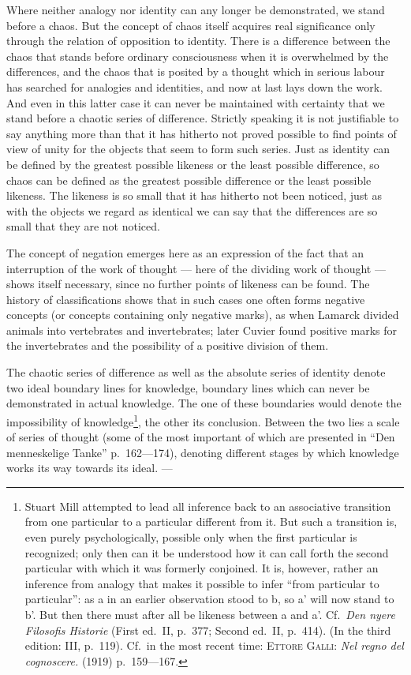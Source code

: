 \documentclass[12pt]{article}
\newcommand{\opage}[1]{\marginnote{\footnotesize\textit{[#1]}}}
\begin{document}
Where neither analogy nor identity can any longer be demonstrated, we stand
before a chaos. But the concept of chaos itself acquires real significance
only through the relation of opposition to identity. There is a difference
between the chaos that stands before ordinary consciousness when it is
overwhelmed by the differences, and the chaos that is posited by a thought
which in serious labour has searched for analogies and identities, and now
at last lays down the work. And even in this latter case it can never be
maintained with certainty that \opage{36}we stand before a chaotic series of
difference. Strictly speaking it is not justifiable to say anything more
than that it has hitherto not proved possible to find points of view of
unity for the objects that seem to form such series. Just as identity can be
defined by the greatest possible likeness or the least possible difference,
so chaos can be defined as the greatest possible difference or the least
possible likeness. The likeness is so small that it has hitherto not been
noticed, just as with the objects we regard as identical we can say that the
differences are so small that they are not noticed.

The concept of negation emerges here as an expression of the fact that an
interruption of the work of thought --- here of the dividing work of thought
--- shows itself necessary, since no further points of likeness can be
found. The history of classifications shows that in such cases one often
forms negative concepts (or concepts containing only negative marks), as
when Lamarck divided animals into vertebrates and invertebrates; later
Cuvier found positive marks for the invertebrates and the possibility of a
positive division of them.

The chaotic series of difference as well as the absolute series of identity
denote two ideal boundary lines for knowledge, boundary lines which can
never be demonstrated in actual knowledge. The one of these boundaries would
denote the impossibility of knowledge\footnote{Stuart Mill attempted to lead
all inference back to an associative transition from one particular to a
particular different from it. But such a transition is, even purely
psychologically, possible only when the first particular is recognized; only
then can it be understood how it can call forth the second particular with
which it was formerly conjoined. It is, however, rather an inference from
analogy that makes it possible to infer ``from particular to particular'':
as a in an earlier observation stood to b, so a' will now stand to b'. But
then there must after all be likeness between a and a'. Cf.\ \textit{Den
nyere Filosofis Historie} (First ed.\ II, p.~377; Second ed.\ II, p.~414).
(In the third edition: III, p.~119). Cf.\ in the most recent time:
\textsc{Ettore Galli}: \textit{Nel regno del cognoscere.} (1919)
p.~159---167.}, the other its conclusion. Between \opage{37}the two lies a scale of
series of thought (some of the most important of which are presented in
``Den menneskelige Tanke'' p.~162---174), denoting different stages by which
knowledge works its way towards its ideal. ---
\end{document}
